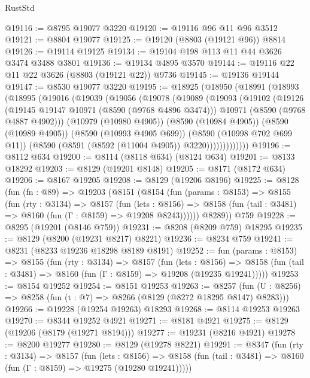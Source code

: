 \begin{lexlean}{RustStd}
\begin{coremodule}
@19116 := @8795 @19077 @3220
@19120 := @19116 @96 @11 @96 @3512
@19121 := @8804 @19077
@19125 := @19120 (@8803 (@19121 @96)) @8814
@19126 := @19114 @19125
@19134 := @19104 @198 @113 @11 @44 @3626 @3474 @3488 @3801
@19136 := @19134 @4895 @3570
@19144 := @19116 @22 @11 @22 @3626 (@8803 (@19121 @22)) @9736
@19145 := @19136 @19144
@19147 := @8530 @19077 @3220
@19195 := @18925
    (@18950
      (@18991
        (@18993
          (@18995
            (@19016
              (@19039
                (@19056
                  (@19078
                    (@19089
                      (@19093
                        (@19102
                          (@19126
                            (@19145 @19147 @10971 (@8590 (@9768 @4896 @3474)))
                            @10971
                            (@8590 (@9768 @4887 @4902)))
                          (@10979 (@10980 @4905))
                          (@8590 (@10984 @4905))
                          (@8590 (@10989 @4905))
                          (@8590 (@10993 @4905 @699))
                          (@8590 (@10998 @702 @699 @11))
                          (@8590 (@8591 (@8592 (@11004 @4905)) @3220)))))))))))))
@19196 := @8112 @634
@19200 := @8114 (@8118 @634) (@8124 @634)
@19201 := @8133 @18292
@19203 := @8129 (@19201 @8148)
@19205 := @8171 (@8172 @634)
@19206 := @8167 @19205
@19208 := @8129 (@19206 @8196)
@19225 := @8128
    (fun (fn : @89) =>
    @19203
      (@8151
        (@8154
          (fun (params : @8153) =>
          @8155
            (fun (rty : @3134) =>
            @8157
              (fun (lets : @8156) =>
              @8158 (fun (tail : @3481) => @8160 (fun (Γ : @8159) => @19208 @8243))))))
        @8289))
    @759
@19228 := @8295 (@19201 (@8146 @759))
@19231 := @8208 (@8209 @759) @18295
@19235 := @8129 (@8200 (@19231 @8217) @8221)
@19236 := @8234 @759
@19241 := @8231 (@8233 @19236 @18298 @8189 @8191)
@19252 := fun (params : @8153) =>
  @8155
    (fun (rty : @3134) =>
    @8157
      (fun (lets : @8156) =>
      @8158 (fun (tail : @3481) => @8160 (fun (Γ : @8159) => @19208 (@19235 @19241)))))
@19253 := @8154 @19252
@19254 := @8151 @19253
@19263 := @8257
    (fun (U : @8256) => @8258 (fun (t : @7) => @8266 (@8129 (@8272 @18295 @8147) @8283)))
@19266 := @19228 (@19254 @19263) @18293
@19268 := @8114 @19253 @19263
@19270 := @8344 @19252 @4921
@19271 := @8181 @4921
@19275 := @8129 (@19206 (@8179 (@19271 @8194)))
@19277 := @19231 (@8216 @4921)
@19278 := @8200 @19277
@19280 := @8129 (@19278 @8221)
@19291 := @8347
    (fun (rty : @3134) =>
    @8157
      (fun (lets : @8156) =>
      @8158 (fun (tail : @3481) => @8160 (fun (Γ : @8159) => @19275 (@19280 @19241)))))

\end{coremodule}
\end{lexlean}
